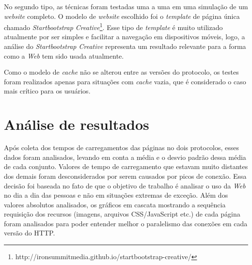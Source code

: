No segundo tipo, as técnicas foram testadas uma a uma em uma simulação de um \textit{website} completo. O modelo de \textit{website} escolhido foi o \textit{template} de página única chamado \textit{Startbootstrap Creative}\footnote{http://ironsummitmedia.github.io/startbootstrap-creative/}. Esse tipo de \textit{template} é muito utilizado atualmente por ser simples e facilitar a navegação em dispositivos móveis, logo, a análise do \textit{Startbootstrap Creative} representa um resultado relevante para a forma como a \textit{Web} tem sido usada atualmente.

Como o modelo de \textit{cache} não se alterou entre as versões do protocolo, os testes foram realizados apenas para situações com \textit{cache} vazia, que é considerado o caso mais crítico para os usuários.

\section{Análise de resultados}
\label{sec:analisederesultados}

Após coleta dos tempos de carregamentos das páginas no dois protocolos, esses dados foram analisados, levando em conta a média e o desvio padrão dessa média de cada conjunto. Valores de tempo de carregamento que estavam muito distantes dos demais foram desconsiderados por serem causados por picos de conexão. Essa decisão foi baseada no fato de que o objetivo de trabalho é analisar o uso da \textit{Web} no dia a dia das pessoas e não em situações extremas  de exceção. Além dos valores absolutos analisados, os gráficos em cascata mostrando a sequência requisição dos recursos (imagens, arquivos CSS/JavaScript etc.) de cada página foram analisados para poder entender melhor o paralelismo das conexões em cada versão do HTTP.